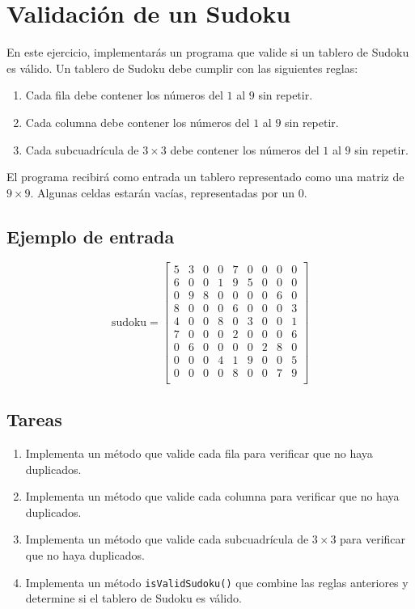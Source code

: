 \section{Validación de un Sudoku}

En este ejercicio, implementarás un programa que valide si un tablero de Sudoku es válido. Un tablero de Sudoku debe cumplir con las siguientes reglas:

\begin{enumerate}
    \item Cada fila debe contener los números del \(1\) al \(9\) sin repetir.
    \item Cada columna debe contener los números del \(1\) al \(9\) sin repetir.
    \item Cada subcuadrícula de \(3 \times 3\) debe contener los números del \(1\) al \(9\) sin repetir.
\end{enumerate}

El programa recibirá como entrada un tablero representado como una matriz de \(9 \times 9\). Algunas celdas estarán vacías, representadas por un \(0\).

\subsection*{Ejemplo de entrada}
\[
\text{sudoku} = 
\begin{bmatrix}
5 & 3 & 0 & 0 & 7 & 0 & 0 & 0 & 0 \\
6 & 0 & 0 & 1 & 9 & 5 & 0 & 0 & 0 \\
0 & 9 & 8 & 0 & 0 & 0 & 0 & 6 & 0 \\
8 & 0 & 0 & 0 & 6 & 0 & 0 & 0 & 3 \\
4 & 0 & 0 & 8 & 0 & 3 & 0 & 0 & 1 \\
7 & 0 & 0 & 0 & 2 & 0 & 0 & 0 & 6 \\
0 & 6 & 0 & 0 & 0 & 0 & 2 & 8 & 0 \\
0 & 0 & 0 & 4 & 1 & 9 & 0 & 0 & 5 \\
0 & 0 & 0 & 0 & 8 & 0 & 0 & 7 & 9 \\
\end{bmatrix}
\]

\subsection*{Tareas}
\begin{enumerate}
    \item Implementa un método que valide cada fila para verificar que no haya duplicados.
    \item Implementa un método que valide cada columna para verificar que no haya duplicados.
    \item Implementa un método que valide cada subcuadrícula de \(3 \times 3\) para verificar que no haya duplicados.
    \item Implementa un método \texttt{isValidSudoku()} que combine las reglas anteriores y determine si el tablero de Sudoku es válido.
\end{enumerate}


